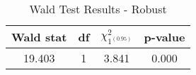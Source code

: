 \begin{table}[H]
\centering
\caption{Wald Test Results - Robust}
\label{tab:wald}
\begin{tabular}{cccc}
\toprule
Wald stat & df & $\chi^2_{1^{(0.95)}}$ & p-value \\
\midrule
19.403 & 1 & 3.841 & 0.000 \\
\bottomrule
\end{tabular}
\end{table}
